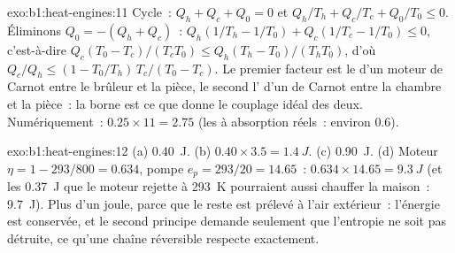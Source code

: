 \begin{solution}{exo:b1:heat-engines:11}
Cycle~: $Q_h + Q_c + Q_0 = 0$ et $Q_h/T_h + Q_c/T_c + Q_0/T_0 \leq 0$.
Éliminons $Q_0 = -(Q_h + Q_c)$~: $Q_h(1/T_h - 1/T_0) + Q_c(1/T_c - 1/T_0) \leq 0$,
c'est-à-dire $Q_c(T_0 - T_c)/(T_cT_0) \leq Q_h(T_h - T_0)/(T_hT_0)$, d'où
$Q_c/Q_h \leq (1 - T_0/T_h)\,T_c/(T_0 - T_c)$. Le premier facteur est le
 d'un moteur de Carnot entre le brûleur et la pièce, le second
l' d'un  de Carnot entre la chambre et la pièce~: la
borne est ce que donne le couplage idéal des deux. Numériquement~: $0.25 \times 11 = 2.75$
(les  à absorption réels~: environ $0.6$).
\end{solution}

\begin{solution}{exo:b1:heat-engines:12}
(a) \qty{0.40}{J}. (b) $0.40 \times 3.5 = \qty{1.4}{J}$. (c) \qty{0.90}{J}.
(d) Moteur $\eta = 1 - 293/800 = 0.634$, pompe $e_p = 293/20 = 14.65$~:
$0.634 \times 14.65 = \qty{9.3}{J}$ (et les \qty{0.37}{J} que le moteur
rejette à \qty{293}{K} pourraient aussi chauffer la maison~: \qty{9.7}{J}). Plus
d'un joule, parce que le reste est prélevé à l'air extérieur~: l'énergie est
conservée, et le second principe demande seulement que l'entropie ne soit pas
détruite, ce qu'une chaîne réversible respecte exactement.
\end{solution}

